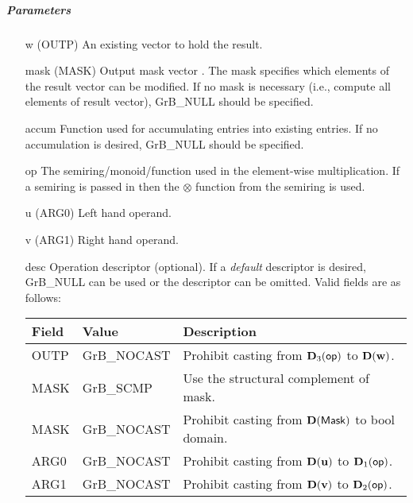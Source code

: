 \subparagraph{Parameters}

\begin{itemize}[leftmargin=1.1in]
    \item[{\sf w}]     ({\sf OUTP}) An existing vector to hold the result.

    \item[{\sf mask}]  ({\sf MASK}) Output mask vector . The mask
    specifies which elements of the result vector can be modified.
    If no mask is necessary (i.e., compute all elements of result
    vector), {\sf GrB\_NULL} should be specified.

    \item[{\sf accum}]  Function used for accumulating entries into existing
                         entries. If no accumulation is desired,
                        {\sf GrB\_NULL} should be specified.

    \item[{\sf op}]    The semiring/monoid/function used in the element-wise multiplication.
                       If a semiring is passed in then the $\otimes$  function from
                                    the semiring is used.
    \item[{\sf u}]     ({\sf ARG0}) Left hand operand.
    \item[{\sf v}]     ({\sf ARG1}) Right hand operand.

    \item[{\sf desc}]  Operation descriptor (optional). If a
    \emph{default} descriptor is desired, {\sf GrB\_NULL} can be
    used or the descriptor can be omitted. Valid fields are as follows: \\
    \begin{tabular}{lll}
    Field  & Value & Description \\
    \hline
    {\sf OUTP} & {\sf GrB\_NOCAST} & Prohibit casting from $\bold{D}_3({\sf op})$ to $\bold{D}({\bf w})$. \\
    {\sf MASK} & {\sf GrB\_SCMP} & Use the structural complement of {\sf mask}. \\
    {\sf MASK} & {\sf GrB\_NOCAST} & Prohibit casting from $\bold{D}({\sf Mask})$ to {\sf bool} domain. \\
    {\sf ARG0} & {\sf GrB\_NOCAST} & Prohibit casting from $\bold{D}({\bf u})$ to $\bold{D}_1({\sf op})$. \\
    {\sf ARG1} & {\sf GrB\_NOCAST} & Prohibit casting from $\bold{D}({\bf v})$ to $\bold{D}_2({\sf op})$. \\
    \end{tabular}
\end{itemize}

